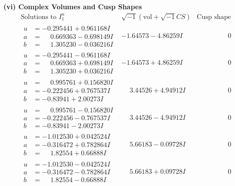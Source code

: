 \documentclass[1p]{elsarticle_modified}
\theoremstyle{definition}
\newcommand{\I}{\sqrt{-1}}
\begin{document}
\newpage\flushleft \textbf{(vi) Complex Volumes and Cusp Shapes}
$$\begin{array}{c|c|c}  
\text{Solutions to }I^u_{1}& \I (\text{vol} + \sqrt{-1}CS) & \text{Cusp shape}\\
 \hline 
\begin{aligned}
u &= -0.295441 + 0.961168 I \\
a &= \phantom{-}0.669363 - 0.698149 I \\
b &= \phantom{-}1.305230 - 0.036216 I\end{aligned}
 & -1.64573 - 4.86259 I & \phantom{-0.000000 } 0 \\ \hline\begin{aligned}
u &= -0.295441 - 0.961168 I \\
a &= \phantom{-}0.669363 + 0.698149 I \\
b &= \phantom{-}1.305230 + 0.036216 I\end{aligned}
 & -1.64573 + 4.86259 I & \phantom{-0.000000 } 0 \\ \hline\begin{aligned}
u &= \phantom{-}0.995761 + 0.156820 I \\
a &= -0.222456 + 0.767537 I \\
b &= -0.83941 + 2.00273 I\end{aligned}
 & \phantom{-}3.44526 + 4.94912 I & \phantom{-0.000000 } 0 \\ \hline\begin{aligned}
u &= \phantom{-}0.995761 - 0.156820 I \\
a &= -0.222456 - 0.767537 I \\
b &= -0.83941 - 2.00273 I\end{aligned}
 & \phantom{-}3.44526 - 4.94912 I & \phantom{-0.000000 } 0 \\ \hline\begin{aligned}
u &= -1.012530 + 0.042524 I \\
a &= -0.316472 + 0.782864 I \\
b &= \phantom{-}1.82554 + 0.66888 I\end{aligned}
 & \phantom{-}5.66183 - 0.09728 I & \phantom{-0.000000 } 0 \\ \hline\begin{aligned}
u &= -1.012530 - 0.042524 I \\
a &= -0.316472 - 0.782864 I \\
b &= \phantom{-}1.82554 - 0.66888 I\end{aligned}
 & \phantom{-}5.66183 + 0.09728 I & \phantom{-0.000000 } 0 \\ \hline\begin{aligned}

\end{aligned}
\end{array}$$
\end{document}
